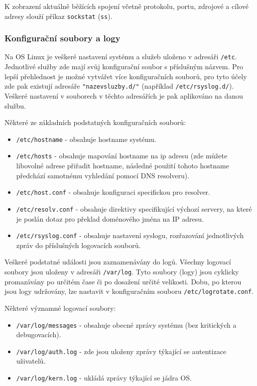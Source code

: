 K zobrazení aktuálně běžících spojení včetně protokolu, portu, zdrojové a cílové adresy slouží příkaz \texttt{sockstat} (\texttt{ss}).

\subsubsection{Konfigurační soubory a logy}
Na OS Linux je veškeré nastavení systému a služeb uloženo v adresáři \texttt{/etc}. Jednotlivé služby zde mají svůj konfigurační soubor s příslušným názvem. Pro lepší přehlednost je možné vytvářet více konfiguračních souborů, pro tyto účely zde pak existují adresáře \texttt{"nazevsluzby.d/"} (například \texttt{/etc/rsyslog.d/}). Veškeré nastavení v souborech v těchto adresářích je pak aplikováno na danou službu.

Některé ze základních podstatných konfiguračních souborů:
\begin{itemize}
				\item \texttt{/etc/hostname} - obsahuje hostname systému.
				\item \texttt{/etc/hosts} - obsahuje mapování hostname na ip adresu (zde můžete libovolné adrese přiřadit hostname, následné použití tohoto hostname předchází samotnému vyhledání pomocí DNS resolveru).
				\item \texttt{/etc/host.conf} - obsahuje konfiguraci specifickou pro resolver.
				\item \texttt{/etc/resolv.conf} - obsahuje direktivy specifikující výchozí servery, na které je poslán dotaz pro překlad doménového jména na IP adresu.
				\item \texttt{/etc/rsyslog.conf} - obsahuje nastavení syslogu, rozřazování jednotlivých zpráv do příslušných logovacích souborů.
\end{itemize}


Veškeré podstatné události jsou zaznamenávány do logů. Všechny logovací soubory jsou uloženy v adresáři \texttt{/var/log}. Tyto soubory (logy) jsou cyklicky promazávány po určitém čase či po dosažení určité velikosti. Dobu, po kterou jsou logy udržovány, lze nastavit v konfiguračním souboru \texttt{/etc/logrotate.conf}.

Některé významné logovací soubory:
\begin{itemize}
				\item \texttt{/var/log/messages} - obsahuje obecné zprávy systému (bez kritických a debugovacích).
				\item \texttt{/var/log/auth.log} - zde jsou uloženy zprávy týkající se autentizace uživatelů.
				\item \texttt{/var/log/kern.log} - ukládá zprávy týkající se jádra OS.
\end{itemize}

